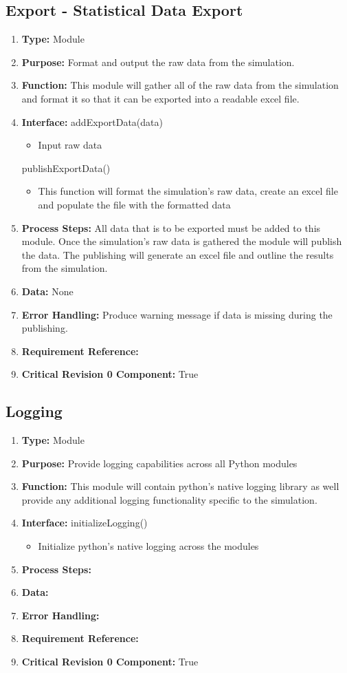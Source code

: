 \documentclass[paper=letter, fontsize=10pt]{scrartcl}
\numberwithin{equation}{section}		%
\numberwithin{figure}{section}			%
\numberwithin{table}{section}				%
\begin{document}
\subsection{Export - Statistical Data Export}
\begin{enumerate}[]
	\item \textbf{Type:} Module
	\item \textbf{Purpose:} Format and output the raw data from the simulation.
	\item \textbf{Function:} This module will gather all of the raw data from the simulation and format it  so that it can be exported into a readable excel file.
	\item \textbf{Interface:}
	addExportData(data)
	\begin{itemize}
		\item Input raw data
	\end{itemize}
	publishExportData()
	\begin{itemize}
		\item This function will format the simulation's raw data, create an excel file and populate the file with the formatted data
	\end{itemize}
	\item \textbf{Process Steps:} All data that is to be exported must be added to this module.  Once the simulation's raw data is gathered the module will publish the data.  The publishing will generate an excel file and outline the results from the simulation.
	\item \textbf{Data:} None
	\item \textbf{Error Handling:}  Produce warning message if data is missing during the publishing.
	\item \textbf{Requirement Reference:}
	\item \textbf{Critical Revision 0 Component:} True
\end{enumerate}
\subsection{Logging}
\begin{enumerate}[]
	\item \textbf{Type:} Module
	\item \textbf{Purpose:} Provide logging capabilities across all Python modules
	\item \textbf{Function:} This module will contain python's native logging library as well provide any additional logging functionality specific to the simulation.
	\item \textbf{Interface:}
	initializeLogging()
		\begin{itemize}
			\item Initialize python's native logging across the modules
		\end{itemize}
	\item \textbf{Process Steps:} 
	\item \textbf{Data:}
	\item \textbf{Error Handling:}
	\item \textbf{Requirement Reference:}
	\item \textbf{Critical Revision 0 Component:} True
\end{enumerate}
\end{document}
